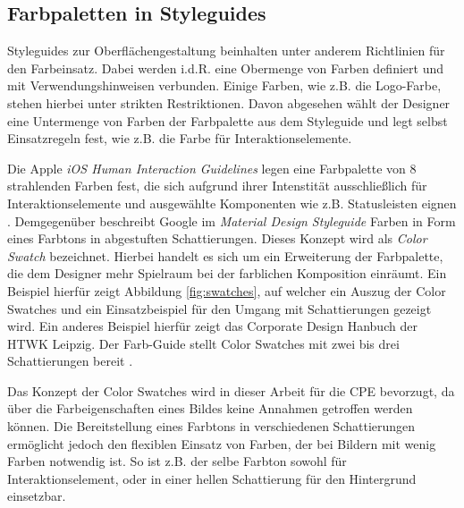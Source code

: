 \documentclass[10pt,a4paper,bibliography=totoc,twocolumn]{scrartcl}
\begin{document}
\subsection{Farbpaletten in Styleguides}
\label{sec:swatches}

Styleguides zur Oberflächengestaltung beinhalten unter anderem Richtlinien für den Farbeinsatz. Dabei werden i.d.R. eine Obermenge von Farben definiert und mit Verwendungshinweisen verbunden. Einige Farben, wie z.B. die Logo-Farbe, stehen hierbei unter strikten Restriktionen. Davon abgesehen wählt der Designer eine Untermenge von Farben der Farbpalette aus dem Styleguide und legt selbst Einsatzregeln fest, wie z.B. die Farbe für Interaktionselemente.

Die Apple \emph{iOS Human Interaction Guidelines} legen eine Farbpalette von 8 strahlenden Farben fest, die sich aufgrund ihrer Intenstität ausschließlich für Interaktionselemente und ausgewählte Komponenten wie z.B. Statusleisten eignen \citep{ios}. Demgegenüber beschreibt Google im \emph{Material Design Styleguide} Farben in Form eines Farbtons in abgestuften Schattierungen. Dieses Konzept wird als \emph{Color Swatch} bezeichnet. Hierbei handelt es sich um ein Erweiterung der Farbpalette, die dem Designer mehr Spielraum bei der farblichen Komposition einräumt. Ein Beispiel hierfür zeigt Abbildung \ref{fig:swatches}, auf welcher ein Auszug der Color Swatches und ein Einsatzbeispiel für den Umgang mit Schattierungen gezeigt wird. Ein anderes Beispiel hierfür zeigt das Corporate Design Hanbuch der HTWK Leipzig. Der Farb-Guide stellt Color Swatches mit zwei bis drei Schattierungen bereit \citep{htwk}.

Das Konzept der Color Swatches wird in dieser Arbeit für die CPE bevorzugt, da über die Farbeigenschaften eines Bildes keine Annahmen getroffen werden können. Die Bereitstellung eines Farbtons in verschiedenen Schattierungen ermöglicht jedoch den flexiblen Einsatz von Farben, der bei Bildern mit wenig Farben notwendig ist. So ist z.B. der selbe Farbton sowohl für Interaktionselement, oder in einer hellen Schattierung für den Hintergrund einsetzbar. 
\end{document}

